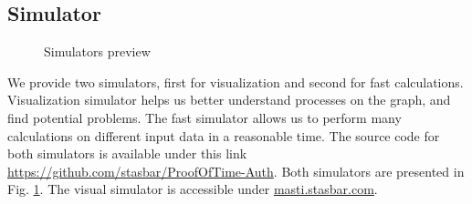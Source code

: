 \documentclass[nostrict]{szablonPG}
\begin{document}
\subsection{Simulator}
\begin{figure}[h!]
 \hfill 	
\caption{Simulators preview}
\label{fig:simulators}
\end{figure}
We provide two simulators, first for visualization and second for fast calculations. Visualization simulator helps us better understand processes on the graph, and find potential problems. The fast simulator allows us to perform many calculations on different input data in a reasonable time. The source code for both simulators is available under this link \url{https://github.com/stasbar/ProofOfTime-Auth}. Both simulators are presented in Fig. \ref{fig:simulators}. The visual simulator is accessible under \url{masti.stasbar.com}.
\end{document}
